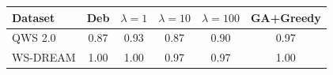 \begin{tabular}{lccccc}
\toprule
Dataset & Deb & $\lambda=1$ & $\lambda=10$ & $\lambda=100$ & GA+Greedy \\
\midrule
QWS 2.0 & 0.87 & 0.93 & 0.87 & 0.90 & 0.97 \\
WS-DREAM & 1.00 & 1.00 & 0.97 & 0.97 & 1.00 \\
\bottomrule
\end{tabular}
